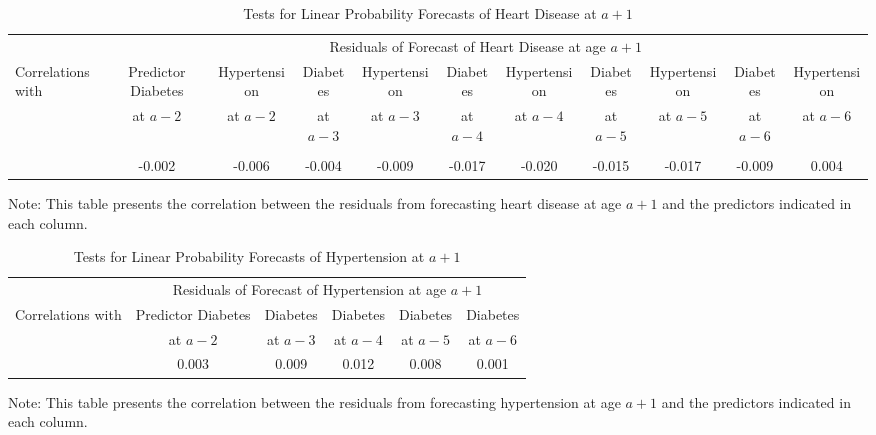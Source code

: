 \begin{landscape}
\begin{table}[H]
\begin{threeparttable}
\caption{Tests for Linear Probability Forecasts of Heart Disease at $a+1$} \label{table:1storderresidsheart}
\scriptsize
\centering
\begin{tabular}{lcccccccccc} \toprule
& \multicolumn{10}{c}{Residuals of Forecast of Heart Disease at age $a+1$} \\
Correlations with	&	Predictor Diabetes &	Hypertension &	Diabetes &	Hypertension &	Diabetes	&	Hypertension &	Diabetes & Hypertension & Diabetes & Hypertension \\
                    &	at $a - 2$ &	at $a - 2$		&	at $a - 3$ & at $a - 3$		& at $a - 4$		& at $a - 4$		& at $a - 5$	& at $a - 5$	& at $a - 6$	& at $a - 6$	\\

\midrule \\
&	-0.002	&	-0.006	&	-0.004	& -0.009 &	-0.017	& -0.020	&	-0.015	&	-0.017 &-0.009	&	0.004	\\
\bottomrule
\end{tabular}
\begin{tablenotes}
\footnotesize
\item Note: This table presents the correlation between the residuals from forecasting heart disease at age $a+1$ and the predictors indicated in each column.
\end{tablenotes}
\end{threeparttable}
\end{table}

\begin{table}[H]
\begin{threeparttable}
\caption{Tests for Linear Probability Forecasts of Hypertension at $a+1$} \label{table:1storderresidshyper}
\centering
\scriptsize
\begin{tabular}{lccccc} \toprule
& \multicolumn{5}{c}{Residuals of Forecast of Hypertension at age $a+1$} \\
Correlations with	&	Predictor Diabetes & Diabetes & Diabetes & Diabetes & Diabetes 	\\
                    & at $a - 2$	& at $a - 3$	& at $a - 4$	& at $a - 5$	& at $a - 6$	\\
\midrule
&	0.003	& 0.009	&	0.012	&	0.008	&	0.001	\\
\bottomrule
\end{tabular}
\begin{tablenotes}
\footnotesize
\item Note: This table presents the correlation between the residuals from forecasting hypertension at age $a+1$ and the predictors indicated in each column.
\end{tablenotes}
\end{threeparttable}
\end{table}


\end{landscape}
